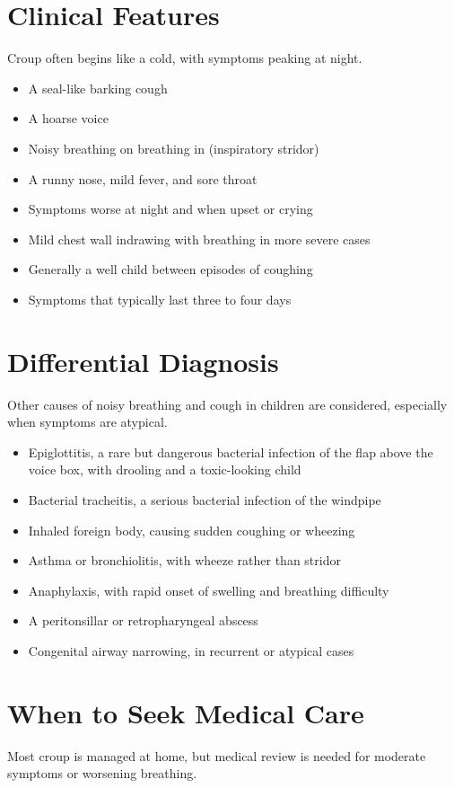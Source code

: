 \section*{Clinical Features}
Croup often begins like a cold, with symptoms peaking at night.

\begin{itemize}
    \item A seal-like barking cough
    \item A hoarse voice
    \item Noisy breathing on breathing in (inspiratory stridor)
    \item A runny nose, mild fever, and sore throat
    \item Symptoms worse at night and when upset or crying
    \item Mild chest wall indrawing with breathing in more severe cases
    \item Generally a well child between episodes of coughing
    \item Symptoms that typically last three to four days
\end{itemize}

\section*{Differential Diagnosis}
Other causes of noisy breathing and cough in children are considered, especially when symptoms are atypical.

\begin{itemize}
    \item Epiglottitis, a rare but dangerous bacterial infection of the flap above the voice box, with drooling and a toxic-looking child
    \item Bacterial tracheitis, a serious bacterial infection of the windpipe
    \item Inhaled foreign body, causing sudden coughing or wheezing
    \item Asthma or bronchiolitis, with wheeze rather than stridor
    \item Anaphylaxis, with rapid onset of swelling and breathing difficulty
    \item A peritonsillar or retropharyngeal abscess
    \item Congenital airway narrowing, in recurrent or atypical cases
\end{itemize}

\section*{When to Seek Medical Care}
Most croup is managed at home, but medical review is needed for moderate symptoms or worsening breathing.

